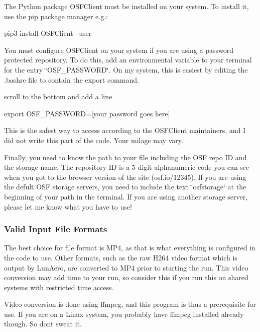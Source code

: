 \begin{DoxyItemize}
\item The Python package {\ttfamily O\+S\+F\+Client} must be installed on your system. To install it, use the {\ttfamily pip} package manager e.\+g.\+: 
\begin{DoxyCode}
pip3 install OSFClient --user
\end{DoxyCode}

\item You must configure O\+S\+F\+Client on your system if you are using a password protected repository. To do this, add an environmental variable to your terminal for the entry \char`\"{}\+O\+S\+F\+\_\+\+P\+A\+S\+S\+W\+O\+R\+D\char`\"{}. On my system, this is easiest by editing the {\ttfamily .bashrc} file to contain the export command. 
 scroll to the bottom and add a line 
\begin{DoxyCode}
export OSF\_PASSWORD=[your password goes here]
\end{DoxyCode}
 This is the safest way to access according to the O\+S\+F\+Client maintainers, and I did not write this part of the code. Your milage may vary.
\item Finally, you need to know the path to your file including the O\+SF repo ID and the storage name. The repository ID is a 5-\/digit alphanumeric code you can see when you got to the browser version of the site (osf.\+io/12345). If you are using the defult O\+SF storage servers, you need to include the text \char`\"{}osfstorage\char`\"{} at the beginning of your path in the terminal. If you are using another storage server, please let me know what you have to use!
\end{DoxyItemize}

\subsubsection*{Valid Input File Formats}

The best choice for file format is M\+P4, as that is what everything is configured in the code to use. Other formats, such as the raw H264 video format which is output by Lun\+Aero, are converted to M\+P4 prior to starting the run. This video conversion may add time to your run, so consider this if you run this on shared systems with restricted time access.

Video conversion is done using {\ttfamily ffmpeg}, and this program is thus a prerequisite for use. If you are on a Linux system, you probably have {\ttfamily ffmpeg} installed already though. So don\textquotesingle{}t sweat it.


